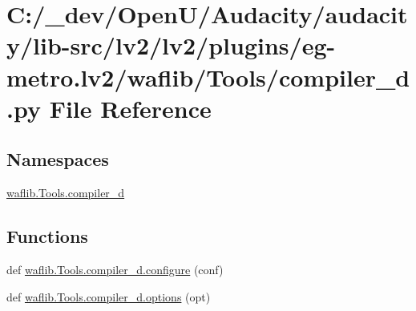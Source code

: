 \hypertarget{lv2_2plugins_2eg-metro_8lv2_2waflib_2_tools_2compiler__d_8py}{}\section{C\+:/\+\_\+dev/\+Open\+U/\+Audacity/audacity/lib-\/src/lv2/lv2/plugins/eg-\/metro.lv2/waflib/\+Tools/compiler\+\_\+d.py File Reference}
\label{lv2_2plugins_2eg-metro_8lv2_2waflib_2_tools_2compiler__d_8py}
\subsection*{Namespaces}
\begin{DoxyCompactItemize}
\item 
 \hyperlink{namespacewaflib_1_1_tools_1_1compiler__d}{waflib.\+Tools.\+compiler\+\_\+d}
\end{DoxyCompactItemize}
\subsection*{Functions}
\begin{DoxyCompactItemize}
\item 
def \hyperlink{namespacewaflib_1_1_tools_1_1compiler__d_a1bde6bb386d77bc326bb0a1b73688c4f}{waflib.\+Tools.\+compiler\+\_\+d.\+configure} (conf)
\item 
def \hyperlink{namespacewaflib_1_1_tools_1_1compiler__d_a4f8b0fc5058863cd242ac3d83ff8f022}{waflib.\+Tools.\+compiler\+\_\+d.\+options} (opt)
\end{DoxyCompactItemize}
